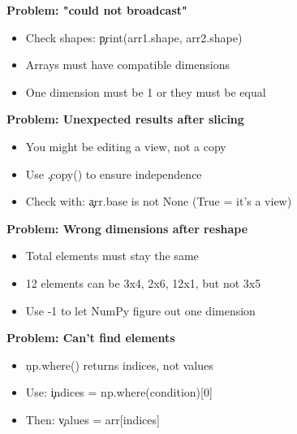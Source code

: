 
\begin{tcolorbox}[
    title=When Things Go Wrong,
    colframe=gray,
    colback = white,
    arc=2mm
]
\textbf{Problem: "could not broadcast"}
\begin{itemize}
\item Check shapes: \c{print(arr1.shape, arr2.shape)}
\item Arrays must have compatible dimensions
\item One dimension must be 1 or they must be equal
\end{itemize}

\textbf{Problem: Unexpected results after slicing}
\begin{itemize}
\item You might be editing a view, not a copy
\item Use \c{.copy()} to ensure independence
\item Check with: \c{arr.base is not None} (True = it's a view)
\end{itemize}

\textbf{Problem: Wrong dimensions after reshape}
\begin{itemize}
\item Total elements must stay the same
\item 12 elements can be 3x4, 2x6, 12x1, but not 3x5
\item Use -1 to let NumPy figure out one dimension
\end{itemize}

\textbf{Problem: Can't find elements}
\begin{itemize}
\item \c{np.where()} returns indices, not values
\item Use: \c{indices = np.where(condition)[0]}
\item Then: \c{values = arr[indices]}
\end{itemize}
\end{tcolorbox}